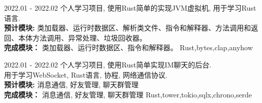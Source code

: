 \documentclass[zh]{resume}
\begin{document}
\begin{projects}
	\project
  {\color{accentcolor}{jvmrs}}{2022.01 - 2022.02}
  {
    个人学习项目, 使用Rust简单的实现JVM虚拟机, 用于学习Rust语言. \\
    {\textbf{预计模块: } 类加载器、运行时数据区、解析类文件、指令和解释器、方法调用和返回、本体方法调用、异常处理、垃圾回收器。} \\
    {\textbf{完成模块：} 类加载器、运行时数据区、指令和解释器。}
  }
  {Rust,bytes,clap,anyhow}

	\project
  {\color{accentcolor}{eChat}}{2022.01 - 2022.02}
  {
    个人学习项目, 使用Rust简单实现IM聊天的后台.\\
    用于学习WebSocket, Rust语言, 协程, 网络通信协议. \\
    {\textbf{预计模块: } 消息通信, 好友管理, 聊天群管理} \\
    {\textbf{完成模块：} 消息通信, 好友管理, 聊天群管理}
  }
  {Rust,tower,tokio,sqlx,chrono,serde}

\end{projects}
\end{document}

